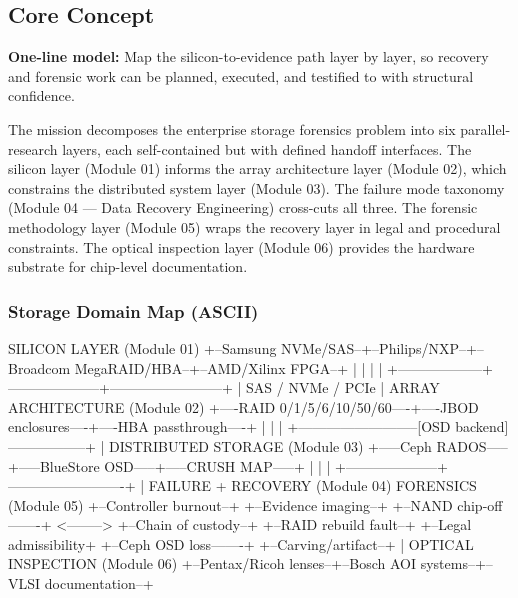 \documentclass[11pt,letterpaper]{article}
\begin{document}
\subsection{Core Concept}

\textbf{One-line model:} Map the silicon-to-evidence path layer by layer, so recovery and forensic work can be planned, executed, and testified to with structural confidence.

The mission decomposes the enterprise storage forensics problem into six parallel-research layers, each self-contained but with defined handoff interfaces. The silicon layer (Module 01) informs the array architecture layer (Module 02), which constrains the distributed system layer (Module 03). The failure mode taxonomy (Module 04 --- Data Recovery Engineering) cross-cuts all three. The forensic methodology layer (Module 05) wraps the recovery layer in legal and procedural constraints. The optical inspection layer (Module 06) provides the hardware substrate for chip-level documentation.

\subsubsection{Storage Domain Map (ASCII)}

\begin{asciibox}
SILICON LAYER (Module 01)
+--Samsung NVMe/SAS--+--Philips/NXP--+--Broadcom MegaRAID/HBA--+--AMD/Xilinx FPGA--+
         |                  |                    |                        |
         +------------------+--------------------+------------------------+
                                    |
                            SAS / NVMe / PCIe
                                    |
ARRAY ARCHITECTURE (Module 02)
+----RAID 0/1/5/6/10/50/60----+----JBOD enclosures----+----HBA passthrough----+
         |                              |                         |
         +--------------------------[OSD backend]-----------------+
                                       |
DISTRIBUTED STORAGE (Module 03)
+-----Ceph RADOS-----+-----BlueStore OSD-----+-----CRUSH MAP-----+
         |                    |                         |
         +--------------------+-------------------------+
                              |
FAILURE + RECOVERY (Module 04)              FORENSICS (Module 05)
+--Controller burnout--+                    +--Evidence imaging--+
+--NAND chip-off-------+      <-------->    +--Chain of custody--+
+--RAID rebuild fault--+                    +--Legal admissibility+
+--Ceph OSD loss-------+                    +--Carving/artifact--+
                              |
OPTICAL INSPECTION (Module 06)
+--Pentax/Ricoh lenses--+--Bosch AOI systems--+--VLSI documentation--+
\end{asciibox}
\end{document}
